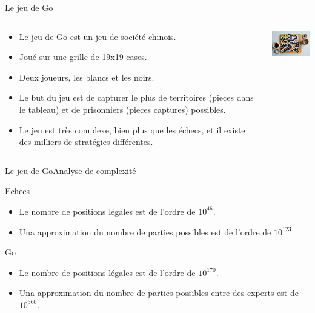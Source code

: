 \begin{frame}{Le jeu de Go}
    \begin{block}{}
        \begin{columns}
            \begin{column}{8cm}
                \begin{itemize}
                    \item Le jeu de Go est un jeu de société chinois.
                    \item Joué sur une grille de 19x19 cases.
                    \item Deux joueurs, les blancs et les noirs.
                    \item Le but du jeu est de capturer le plus de territoires (pieces dans le tableau) et de prisonniers (pieces captures) possibles.
                    \item Le jeu est très complexe, bien plus que les échecs, et il existe des milliers de stratégies différentes.
                \end{itemize}
            \end{column}
            \begin{column}{3cm}
                \includegraphics[width=3cm]{ressources/Go_tableau}
            \end{column}
        \end{columns}
    \end{block}
\end{frame}


\begin{frame}{Le jeu de Go}{Analyse de complexité}
    \begin{block}{Echecs}
        \begin{itemize}
            \item Le nombre de positions légales est de l'ordre de $10^{46}$.
            \item Una approximation du nombre de parties possibles est de l'ordre de $10^{123}$.
        \end{itemize}
    \end{block}
    \pause
    \begin{alertblock}{Go}
        \begin{itemize}
            \item Le nombre de positions légales est de l'ordre de $10^{170}$.
            \item Una approximation du nombre de parties possibles entre des experts est de $10^{360}$.
        \end{itemize}
    \end{alertblock}
\end{frame}

